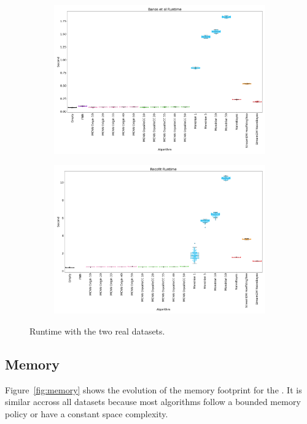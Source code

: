\begin{figure}
	\begin{subfigure}[t]{.5\linewidth}
		\includegraphics[width=\linewidth]{figures/results/banos_3_runtime.png}
		\caption{\banosdataset}
		\label{fig:runtime-banos}
	\end{subfigure}
	\begin{subfigure}[t]{.5\linewidth}
		\includegraphics[width=\linewidth]{figures/results/recofit_3_runtime.png}
		\caption{\recofitdataset}
		\label{fig:runtime-recofit}
	\end{subfigure}
	\caption{Runtime with the two real datasets.}
	\label{fig:runtime}
\end{figure}

\subsection{Memory}
Figure~\ref{fig:memory} shows the evolution of the memory footprint for the
\banosdataset.  It is similar accross all datasets because most algorithms follow
a bounded memory policy or have a constant space complexity.

